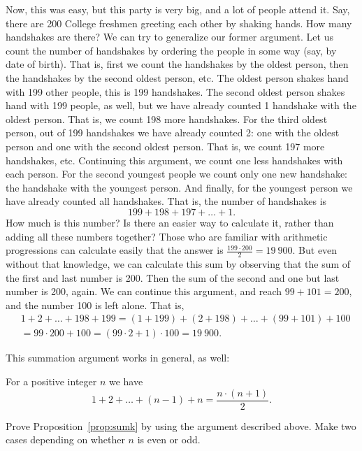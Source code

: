 Now, this was easy, but this party is very big, and a lot of people attend it. 
Say, there are 200 College freshmen greeting each other by shaking hands. 
How many handshakes are there? 
We can try to generalize our former argument. 
Let us count the number of handshakes by ordering the people in some way 
(say, by date of birth). 
That is, first we count the handshakes by the oldest person, 
then the handshakes by the second oldest person, etc. 
The oldest person shakes hand with 199 other people, 
this is 199 handshakes. 
The second oldest person shakes hand with 199 people, as well, 
but we have already counted 1 handshake with the oldest person. 
That is, we count 198 more handshakes. 
For the third oldest person, out of 199 handshakes we have already counted 2: 
one with the oldest person and one with the second oldest person. 
That is, we count 197 more handshakes, etc. 
Continuing this argument, 
we count one less handshakes with each person. 
For the second youngest people we count only one new handshake: the handshake with the youngest person. 
And finally, for the youngest person we have already counted all handshakes. 
That is, the number of handshakes is 
\[
199 + 198 + 197 + \dots + 1. 
\]
How much is this number? 
Is there an easier way to calculate it, 
rather than adding all these numbers together? 
Those who are familiar with arithmetic progressions can calculate easily that the answer is $\frac{199 \cdot 200}{2} = 19~900$. 
But even without that knowledge, 
we can calculate this sum by observing that the sum of the first and last number is 200. 
Then the sum of the second and one but last number is 200, again. 
We can continue this argument, and reach $99+101=200$, 
and the number 100 is left alone. 
That is, 
\begin{align*}
& 1 + 2 + \dots + 198 + 199 = (1 + 199) + (2 + 198) + \dots + (99 + 101) + 100 \\
& = 99\cdot 200 + 100 = (99 \cdot 2 + 1 ) \cdot 100 = 19~900. 
\end{align*}

This summation argument works in general, as well: 

\begin{proposition}\label{prop:sumk}
For a positive integer $n$ we have 
\[
1 + 2 + \dots + (n-1) + n = \frac{n \cdot (n+1)}{2}. 
\]
\end{proposition}

\begin{exercise}\label{ex:sumk}
Prove Proposition~\ref{prop:sumk} by using the argument described above. 
Make two cases depending on whether $n$ is even or odd. 
\end{exercise}

